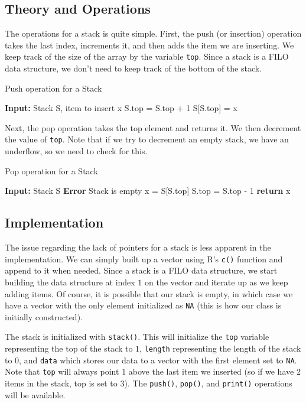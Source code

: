 \documentclass[11pt]{article}
\begin{document}
\subsection{Theory and Operations}
The operations for a stack is quite simple. First, the push (or insertion) operation takes the last index, increments it, and then adds the item we are inserting. We keep track of the size of the array by the variable {\tt top}. Since a stack is a FILO data structure, we don't need to keep track of the bottom of the stack.
\begin{algorithm}[H]
    \caption{Push operation for a Stack}
    \begin{algorithmic}[1]
        \State \textbf{Input: } Stack S, item to insert x
        \State S.top = S.top + 1
        \State S[S.top] = x
    \end{algorithmic}
\end{algorithm}

Next, the pop operation takes the top element and returns it. We then decrement the value of {\tt top}. Note that if we try to decrement an empty stack, we have an underflow, so we need to check for this.
\begin{algorithm}[H]
    \caption{Pop operation for a Stack}
    \begin{algorithmic}[1]
        \State \textbf{Input: } Stack S
            \State \textbf{Error} Stack is empty
        \Else
            \State x = S[S.top]
            \State S.top = S.top - 1
        \EndIf
        \State \textbf{return} x
    \end{algorithmic}
\end{algorithm}

\subsection{Implementation}
The issue regarding the lack of pointers for a stack is less apparent in the implementation. We can simply built up a vector using R's {\tt c()} function and append to it when needed. Since a stack is a FILO data structure, we start building the data structure at index $1$ on the vector and iterate up as we keep adding items. Of course, it is possible that our stack is empty, in which case we have a vector with the only element initialized as {\tt NA} (this is how our class is initially constructed).

The stack is initialized with {\tt stack()}. This will initialize the {\tt top} variable representing the top of the stack to $1$, {\tt length} representing the length of the stack to $0$, and {\tt data} which stores our data to a vector with the first element set to {\tt NA}. Note that {\tt top} will always point $1$ above the last item we inserted (so if we have $2$ items in the stack, top is set to $3$). The {\tt push()}, {\tt pop()}, and {\tt print()} operations will be available.
\end{document}
